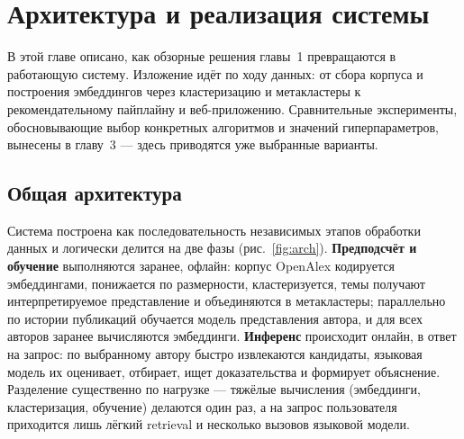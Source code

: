 \newpage
\section{Архитектура и реализация системы}
\label{ch:impl}

В этой главе описано, как обзорные решения главы~1 превращаются в работающую систему. Изложение
идёт по ходу данных: от сбора корпуса и построения эмбеддингов через кластеризацию и метакластеры
к рекомендательному пайплайну и веб-приложению. Сравнительные эксперименты, обосновывающие выбор
конкретных алгоритмов и значений гиперпараметров, вынесены в главу~3 — здесь приводятся уже
выбранные варианты.

\subsection{Общая архитектура}
\label{sec:arch}

Система построена как последовательность независимых этапов обработки данных и логически делится
на две фазы (рис.~\ref{fig:arch}). \textbf{Предподсчёт и обучение} выполняются заранее, офлайн:
корпус OpenAlex кодируется эмбеддингами, понижается по размерности, кластеризуется, темы получают
интерпретируемое представление и объединяются в метакластеры; параллельно по истории публикаций
обучается модель представления автора, и для всех авторов заранее вычисляются эмбеддинги.
\textbf{Инференс} происходит онлайн, в ответ на запрос: по выбранному автору быстро извлекаются
кандидаты, языковая модель их оценивает, отбирает, ищет доказательства и формирует объяснение.
Разделение существенно по нагрузке — тяжёлые вычисления (эмбеддинги, кластеризация, обучение)
делаются один раз, а на запрос пользователя приходится лишь лёгкий retrieval и несколько вызовов
языковой модели.

